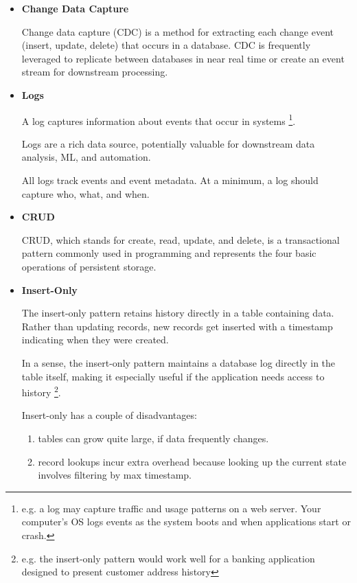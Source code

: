 \begin{itemize}
    \item \textbf{Change Data Capture}
    
    \noindent
    Change data capture (CDC) is a method for extracting each
    change event (insert, update, delete) that occurs in a
    database. CDC is frequently leveraged to replicate
    between databases in near real time or create an event
    stream for downstream processing.


    \item \textbf{Logs}
    
    \noindent
    A log captures information about events that occur in systems
    \footnote{
        e.g. a log may capture traffic and usage patterns on a
        web server. Your computer's OS logs events as the system
        boots and when applications start or crash.
    }.

    Logs are a rich data source, potentially valuable for
    downstream data analysis, ML, and automation.

    All logs track events and event metadata. At a minimum, a
    log should capture who, what, and when.

    \item \textbf{CRUD}
    
    \noindent
    CRUD, which stands for create, read, update, and delete, is a
    transactional pattern commonly used in programming and
    represents the four basic operations of persistent storage.


    \item \textbf{Insert-Only}
    
    \noindent
    The insert-only pattern retains history directly in a table
    containing data. Rather than updating records, new records
    get inserted with a timestamp indicating when they were
    created.

    In a sense, the insert-only pattern maintains a database
    log directly in the table itself, making it especially
    useful if the application needs access to history
    \footnote{
        e.g. the insert-only pattern would work well for a
        banking application designed to present customer
        address history
    }.

    Insert-only has a couple of disadvantages:
    \begin{enumerate}
        \item tables can grow quite large,
         if data frequently changes.
        \item record lookups incur extra overhead
        because looking up the current state
        involves filtering by max timestamp.
    \end{enumerate}
    


\end{itemize}
